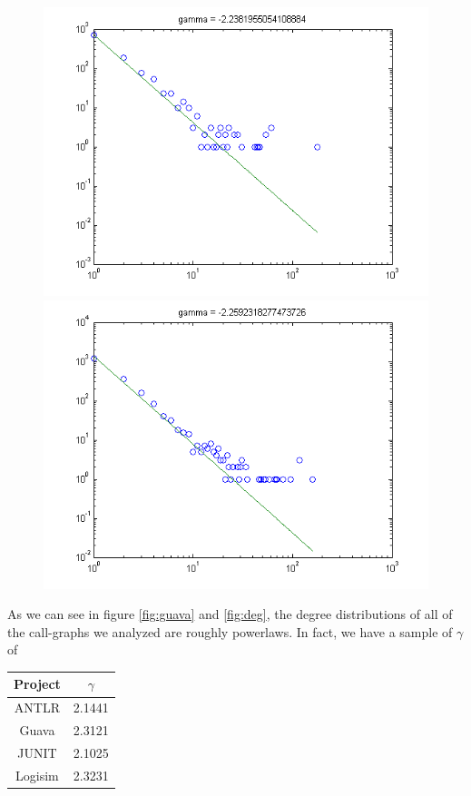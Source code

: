 \documentclass[11pt,a4paper,twocolumn]{article}
\begin{document}
\begin{singlespace}
\begin{figure}
\includegraphics[scale=0.5]{images/webmagic}
\includegraphics[scale=0.5]{images/xstream}
\end{figure}
As we can see in figure \ref{fig:guava} and \ref{fig:deg}, the degree distributions of
all of the call-graphs we analyzed are roughly powerlaws. In fact, we have a sample of
$\gamma$ of
\begin{table}[H]
\centering
\begin{tabular}{|c|c|} \hline
Project & $\gamma$ \\ \hline 
ANTLR & 2.1441 \\
Guava & 2.3121 \\
JUNIT & 2.1025 \\
Logisim & 2.3231 \\

\end{tabular}
\end{table}
\end{singlespace}
\end{document}
